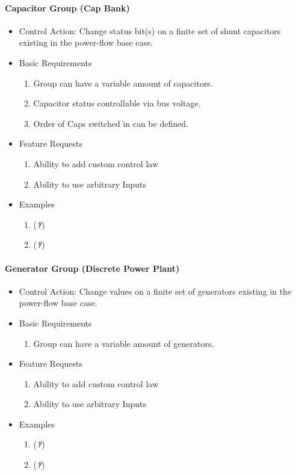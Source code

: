 \documentclass[12pt]{article}
\newcommand{\q}{(\textit{\textbf{?}})}
\begin{document}
\pagebreak
\begin{multicols*}{2}
\raggedright
\paragraph{Capacitor Group (Cap Bank)}
\begin{itemize}
	\item Control Action: Change status bit(s) on a finite set of shunt capacitors existing in the power-flow base case. 
	\item Basic Requirements
	\begin{enumerate}
		\item Group can have a variable amount of capacitors.
		\item Capacitor status controllable via bus voltage.
		\item Order of Caps switched in can be defined.
	\end{enumerate}
	\item Feature Requests
	\begin{enumerate}
		\item Ability to add custom control law
		\item Ability to use arbitrary Inputs
	\end{enumerate}
	\item Examples
	\begin{enumerate}
	\item \q
	\item \q
	\end{enumerate}	
\end{itemize}

\paragraph{Generator Group (Discrete Power Plant)}
\begin{itemize}
	\item Control Action: Change values on a finite set of generators existing in the power-flow base case. 
	\item Basic Requirements
	\begin{enumerate}
		\item Group can have a variable amount of generators.
	\end{enumerate}
	\item Feature Requests
	\begin{enumerate}
		\item Ability to add custom control law
		\item Ability to use arbitrary Inputs
	\end{enumerate}
	\item Examples
	\begin{enumerate}
	\item \q
	\item \q
	\end{enumerate}	
\end{itemize}


\end{multicols*}
\end{document}
